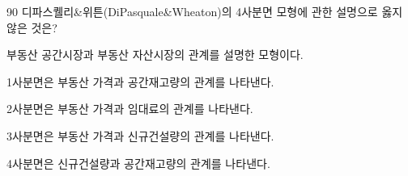 \begin{question}{90}
디파스퀠리\&위튼(DiPasquale\&Wheaton)의 4사분면 모형에 관한 설명으로 옳지 않은 것은?
\begin{choices}
  \item 부동산 공간시장과 부동산 자산시장의 관계를 설명한 모형이다.
  \item 1사분면은 부동산 가격과 공간재고량의 관계를 나타낸다.
  \item 2사분면은 부동산 가격과 임대료의 관계를 나타낸다.
  \item 3사분면은 부동산 가격과 신규건설량의 관계를 나타낸다.
  \item 4사분면은 신규건설량과 공간재고량의 관계를 나타낸다.
\end{choices}
\end{question}
